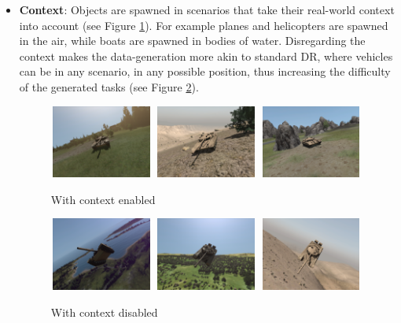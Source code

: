 \begin{itemize}
    \item \textbf{Context}: Objects are spawned in scenarios that take their real-world context into account (see Figure \ref{with-context}). For example planes and helicopters are spawned in the air, while boats are spawned in bodies of water. Disregarding the context makes the data-generation more akin to standard \gls{DR}, where vehicles can be in any scenario, in any possible position, thus increasing the difficulty of the generated tasks (see Figure \ref{no-context}).
    
    \begin{figure}[H]
    \centering
      {\includegraphics[height=2.4cm, width=3.4cm]{images/vbs3/random-pos/context1}}
      {\includegraphics[height=2.4cm, width=3.4cm]{images/vbs3/random-pos/context2}}
      {\includegraphics[height=2.4cm, width=3.4cm]{images/vbs3/random-pos/context3}}
    \caption{With context enabled}
    \label{with-context}
    \end{figure}

    \begin{figure}[H]
    \centering
      {\includegraphics[height=2.4cm, width=3.4cm]{images/vbs3/random-pos/no-context1}}
      {\includegraphics[height=2.4cm, width=3.4cm]{images/vbs3/random-pos/no-context2}}
      {\includegraphics[height=2.4cm, width=3.4cm]{images/vbs3/random-pos/no-context3}}
    \caption{With context disabled}
    \label{no-context}
    \end{figure}


\end{itemize}
